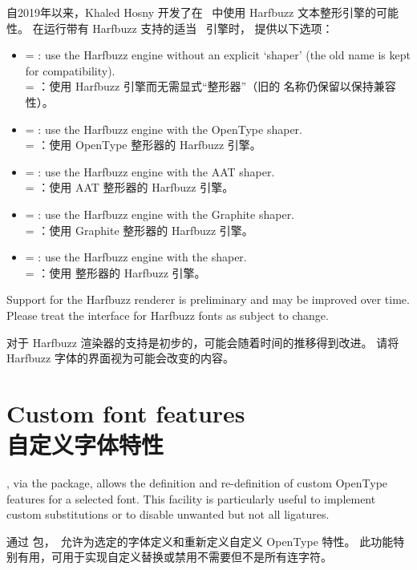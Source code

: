 \documentclass[a4paper]{l3doc}
\begin{document}
自2019年以来，Khaled Hosny 开发了在 \LuaTeX\ 中使用 Harfbuzz 文本整形引擎的可能性。
在运行带有 Harfbuzz 支持的适当 \LuaTeX\ 引擎时， 提供以下选项：
\begin{itemize}
\item {} =  : use the Harfbuzz engine without an explicit `shaper' (the old  name is kept for compatibility).
\\  = ：使用 Harfbuzz 引擎而无需显式“整形器”（旧的  名称仍保留以保持兼容性）。
\item {} =  : use the Harfbuzz engine with the OpenType shaper.
\\  = ：使用 OpenType 整形器的 Harfbuzz 引擎。
\item {} =  : use the Harfbuzz engine with the AAT shaper.
\\  = ：使用 AAT 整形器的 Harfbuzz 引擎。
\item {} =  : use the Harfbuzz engine with the Graphite shaper.
\\  = ：使用 Graphite 整形器的 Harfbuzz 引擎。
\item {} =  : use the Harfbuzz engine with the  shaper.
\\  = ：使用  整形器的 Harfbuzz 引擎。
\end{itemize}

Support for the Harfbuzz renderer is preliminary and may be improved over time.
Please treat the interface for Harfbuzz fonts as subject to change.

对于 Harfbuzz 渲染器的支持是初步的，可能会随着时间的推移得到改进。
请将 Harfbuzz 字体的界面视为可能会改变的内容。
\section{Custom font features\\自定义字体特性}

\LuaTeX, via the  package, allows the definition and re-definition of custom OpenType features for a selected font. This facility is particularly useful to implement custom substitutions or to disable unwanted but not all ligatures.

通过  包，\LuaTeX\ 允许为选定的字体定义和重新定义自定义 OpenType 特性。
此功能特别有用，可用于实现自定义替换或禁用不需要但不是所有连字符。
\end{document}
